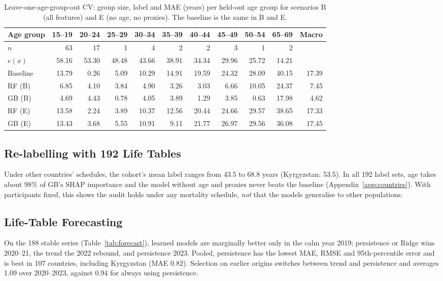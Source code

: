 \documentclass[runningheads]{llncs}
\begin{document}
\begin{table}[t]
\centering
\caption{Leave-one-age-group-out CV: group size, label and MAE (years) per held-out age group for
scenarios B (all features) and E (no age, no proxies). The baseline is the same in B and E.}\label{tab:groups}
\scriptsize\setlength{\tabcolsep}{4pt}
\begin{tabular}{@{}lrrrrrrrrr|r@{}}
\toprule
Age group & 15--19 & 20--24 & 25--29 & 30--34 & 35--39 & 40--44 & 45--49 & 50--54 & 65--69 & Macro \\
\midrule
$n$ & 63 & 17 & 1 & 4 & 2 & 2 & 3 & 1 & 2 & \\
$e(x)$ & 58.16 & 53.30 & 48.48 & 43.66 & 38.91 & 34.34 & 29.96 & 25.72 & 14.21 & \\
\midrule
Baseline & 13.79 & 0.26 & 5.09 & 10.29 & 14.91 & 19.59 & 24.32 & 28.09 & 40.15 & 17.39 \\
RF (B) & 6.85 & 4.10 & 3.84 & 4.90 & 3.26 & 3.03 & 6.66 & 10.05 & 24.37 & 7.45 \\
GB (B) & 4.69 & 4.43 & 0.78 & 4.05 & 3.89 & 1.29 & 3.85 & 0.63 & 17.98 & 4.62 \\
RF (E) & 13.58 & 2.24 & 3.89 & 10.37 & 12.56 & 20.44 & 24.66 & 29.57 & 38.65 & 17.33 \\
GB (E) & 13.43 & 3.68 & 5.55 & 10.91 & 9.11 & 21.77 & 26.97 & 29.56 & 36.08 & 17.45 \\
\bottomrule
\end{tabular}
\end{table}

\subsection{Re-labelling with 192 Life Tables}

Under other countries' schedules, the cohort's mean label ranges from 43.5 to 68.8 years (Kyrgyzstan:
53.5). In all 192 label sets, age takes about 98\% of GB's SHAP importance and the model without age
and proxies never beats the baseline (Appendix~\ref{app:countries}). With participants fixed, this
shows the audit holds under any mortality schedule, \emph{not} that the models generalise to other
populations.

\subsection{Life-Table Forecasting}

On the 188 stable series (Table~\ref{tab:forecast}), learned models are marginally better only in
the calm year 2019; persistence or Ridge wins 2020--21, the trend the 2022 rebound, and persistence
2023. Pooled, persistence has the lowest MAE, RMSE and 95th-percentile error and is best in 107
countries, including Kyrgyzstan (MAE 0.82). Selection on earlier origins switches between trend and
persistence and averages 1.09 over 2020--2023, against 0.94 for always using persistence.
\end{document}

